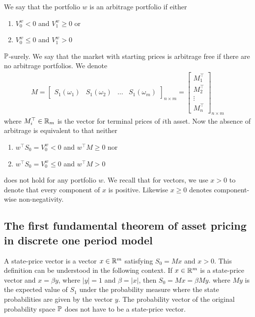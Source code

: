We say that the portfolio $w$ is an arbitrage portfolio if either
  \begin{enumerate}[labelindent=\parindent, leftmargin=*]
    \item $V_0^w < 0$ and $V_1^w \geq 0$ or
    \item $V_0^w \leq 0$ and $V_1^w > 0$
  \end{enumerate}
$\mathbb{P}$-surely. We say that the market with starting prices is arbitrage free if there are no arbitrage portfolios. We denote
  \begin{align}
    \label{marketmatrixindiscretesetting}
    M = \begin{bmatrix} S_1 ( \omega_1 ) & S_1 ( \omega_2 ) & \ldots & S_1  ( \omega_m ) \end{bmatrix}_{n \times m} = \begin{bmatrix} M_1^{\top} \\ M_2^{\top} \\ \vdots \\ M_n^{\top} \end{bmatrix}_{n \times m}
  \end{align}
where $M_i^{\top} \in \mathbb{R}_m$ is the vector for terminal prices of $i$th asset. Now the absence of arbitrage is equivalent to that neither
  \begin{enumerate}[labelindent=\parindent, leftmargin=*]
    \item $w^{\top} S_0 = V_0^w < 0$ and $w^{\top} M \geq 0$ nor
    \item $w^{\top} S_0 = V_0^w \leq 0$ and $w^{\top} M > 0$
  \end{enumerate}
does not hold for any portfolio $w$. We recall that for vectors, we use $x > 0$ to denote that every component of $x$ is positive. Likewise $x \geq 0$ denotes component-wise non-negativity.

\subsection{The first fundamental theorem of asset pricing in discrete one period model}

A state-price vector is a vector $x \in \mathbb{R}^m$ satisfying $S_0 = Mx$ and $x > 0$. This definition can be understood in the following context. If $x \in \mathbb{R}^m$ is a state-price vector and $x = \beta y$, where $\left| y \right| = 1 $ and $\beta = \left| x \right|$, then $S_0 = Mx = \beta M y$. where $My$ is the expected value of $S_1$ under the probability measure where the state probabilities are given by the vector $y$. The probability vector of the original probability space $\mathbb{P}$ does not have to be a state-price vector.

